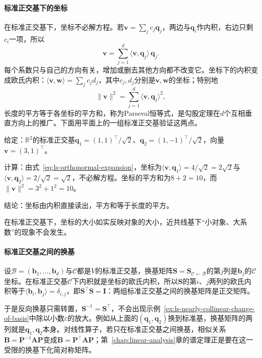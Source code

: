 \paragraph{标准正交基下的坐标}
在标准正交基下，坐标不必解方程。若$\bm v=\sum_jc_j\bm q_j$，两边与$\bm q_i$作内积，右边只剩$c_i$一项，所以
\begin{equation}
 \bm v=\sum_{j=1}^d\langle\bm v,\bm q_j\rangle\,\bm q_j.
 \label{eq:ls-orthonormal-expansion}
\end{equation}
每个系数只与自己的方向有关，增加或删去其他方向都不改变它。坐标下的内积变成欧氏内积：$\langle\bm v,\bm w\rangle=\sum_jc_jd_j$，其中$c_j,d_j$分别是$\bm v,\bm w$的坐标；特别地
\begin{equation}
 \lVert\bm v\rVert^2=\sum_{j=1}^d\langle\bm v,\bm q_j\rangle^2,
 \label{eq:ls-parseval}
\end{equation}
长度的平方等于各坐标的平方和，称为Parseval恒等式，是勾股定理在$d$个互相垂直方向上的推广。下面用平面上的一组标准正交基验证这两点。
\begin{example}[标准正交基下的坐标与Parseval恒等式]
\label{ex:ls-orthonormal-coordinates}
给定：$\mathbb R^2$的标准正交基$\bm q_1=(1,1)^\top/\sqrt2$、$\bm q_2=(1,-1)^\top/\sqrt2$，向量$\bm v=(3,1)^\top$。

计算：由式~\eqref{eq:ls-orthonormal-expansion}，坐标为$\langle\bm v,\bm q_1\rangle=4/\sqrt2=2\sqrt2$与$\langle\bm v,\bm q_2\rangle=2/\sqrt2=\sqrt2$，不必解方程。坐标的平方和为$8+2=10$，而$\lVert\bm v\rVert^2=3^2+1^2=10$。

结论：坐标由内积直接读出，平方和等于长度的平方。
\end{example}
在标准正交基下，坐标的大小如实反映对象的大小，近共线基下“小对象、大系数”的现象不会发生。

\paragraph{标准正交基之间的换基}
设$\mathcal B=(\bm b_1,\ldots,\bm b_d)$与$\mathcal C$都是$V$的标准正交基，换基矩阵$\bm S=\bm S_{\mathcal C\leftarrow\mathcal B}$的第$j$列是$\bm b_j$的$\mathcal C$坐标。在标准正交基$\mathcal C$下内积就是坐标的欧氏内积，所以$\bm S$的第$i$、$j$两列的欧氏内积等于$\langle\bm b_i,\bm b_j\rangle=\delta_{i,j}$，即$\bm S^\top\bm S=\bm I$：两组标准正交基之间的换基矩阵是正交矩阵。

于是反向换基只需转置，$\bm S^{-1}=\bm S^\top$，不会出现示例~\ref{ex:ls-nearly-collinear-change-of-basis}中除以小数$\varepsilon$的放大。例如从上面的$(\bm q_1,\bm q_2)$换到标准基，换基矩阵的两列就是$\bm q_1,\bm q_2$本身。对线性算子，若只在标准正交基之间换基，相似关系$\bm B=\bm P^{-1}\bm A\bm P$变成$\bm B=\bm P^\top\bm A\bm P$；第~\ref{chap:linear-analysis}章的谱定理正是要在这一受限的换基下化简对称矩阵。

